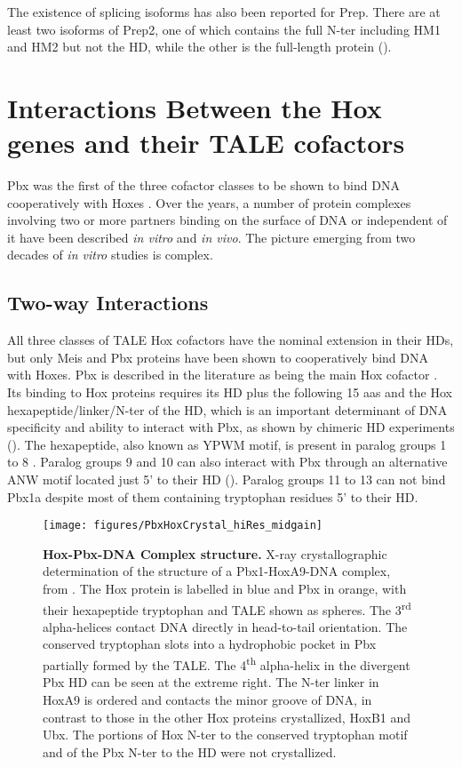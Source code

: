 The existence of splicing isoforms has also been reported for Prep. There are at least two isoforms of Prep2, one of which contains the full \ac{N-ter} including HM1 and HM2 but not the \ac{HD}, while the other is the full-length protein (\cite{Haller2004}).

\section{Interactions Between the Hox genes and their TALE cofactors}
\label{sec:interactions}

Pbx was the first of the three cofactor classes to be shown to bind DNA cooperatively with Hoxes \cite{Chan1994}. Over the years, a number of protein complexes involving two or more partners binding on the surface of DNA or independent of it have been described \textit{in vitro} and \textit{in vivo}. The picture emerging from two decades of \textit{in vitro} studies is complex. 

\subsection{Two-way Interactions}

All three classes of \ac{TALE} Hox cofactors have the nominal extension in their \acp{HD}, but only Meis and Pbx proteins have been shown to cooperatively bind DNA with Hoxes. Pbx is described in the literature as being the main Hox cofactor \cite{ref}. Its binding to Hox proteins requires its \ac{HD} plus the following 15 \acp{aa} and the Hox hexapeptide/linker/\ac{N-ter} of the \ac{HD}, which is an important determinant of DNA specificity and ability to interact with Pbx, as shown by chimeric \ac{HD} experiments (\cite{Chang1996, Phelan1997}). The hexapeptide, also known as YPWM motif, is present in paralog groups 1 to 8 \cite{Chang1995, Passner1999}. Paralog groups 9 and 10 can also interact with Pbx through an alternative ANW motif located just 5' to their \ac{HD} (\cite{Chang1996, Shen1997a}). Paralog groups 11 to 13 can not bind Pbx1a despite most of them containing tryptophan residues 5' to their \ac{HD}. 

\begin{figure}[]
  \centering
  \texttt{[image: figures/PbxHoxCrystal\_hiRes\_midgain]}
  \caption[Hox-Pbx-DNA Complex structure]{\textbf{Hox-Pbx-DNA Complex structure.} X-ray crystallographic determination of the structure of a Pbx1-HoxA9-DNA complex, from \cite{LaRonde-LeBlanc2003}. The Hox protein is labelled in blue and Pbx in orange, with their hexapeptide tryptophan and \ac{TALE} shown as spheres. The 3\textsuperscript{rd} alpha-helices contact DNA directly in head-to-tail orientation. The conserved tryptophan slots into a hydrophobic pocket in Pbx partially formed by the \ac{TALE}. The 4\textsuperscript{th} alpha-helix in the divergent Pbx \ac{HD} can be seen at the extreme right. The \ac{N-ter} linker in HoxA9 is ordered and contacts the minor groove of DNA, in contrast to those in the other Hox proteins crystallized, HoxB1 and Ubx. The portions of Hox \ac{N-ter} to the conserved tryptophan motif and of the Pbx \ac{N-ter} to the \ac{HD} were not crystallized.}
  \label{fig:PbxHoxCrystal}
\end{figure}

